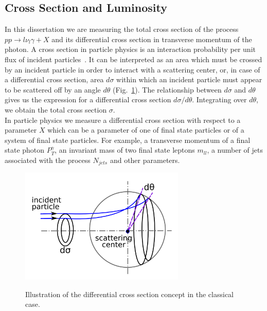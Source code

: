 \subsection{Cross Section and Luminosity}

\label{sec:LumiAndCS}

In this dissertation we are measuring the total cross section of the process $pp \rightarrow l \nu_l \gamma + X$ and its differential cross section in transverse momentum of the photon. A cross section in particle physics is an interaction probability per unit flux of incident particles~\cite{ref_fnal_LumiCS}. It can be interpreted as an area which must be crossed by an incident particle in order to interact with a scattering center, or, in case of a differential cross section, area $d\sigma$ within which an incident particle must appear to be scattered off by an angle $d\theta$ (Fig.~\ref{fig:CSclassical}). The relationship between $d\sigma$ and $d\theta$ gives us the expression for a differential cross section $d\sigma/d\theta$. Integrating over $d\theta$, we obtain the total cross section $\sigma$. \\

In particle physics we measure a differential cross section with respect to a parameter $X$ which can be a parameter of one of final state particles or of a system of final state particles. For example, a transverse momentum of a final state photon $P_T^\gamma$, an invariant mass of two final state leptons $m_{ll}$, a number of jets associated with the process $N_{jets}$ and other parameters. \\

\begin{figure}[htb]
  \begin{center}
    {\includegraphics[width=0.70\textwidth]{../figs/WgAbout/CSclassical.png}}
    \caption{Illustration of the differential cross section concept in the classical case.}
    \label{fig:CSclassical}
  \end{center}
\end{figure}


